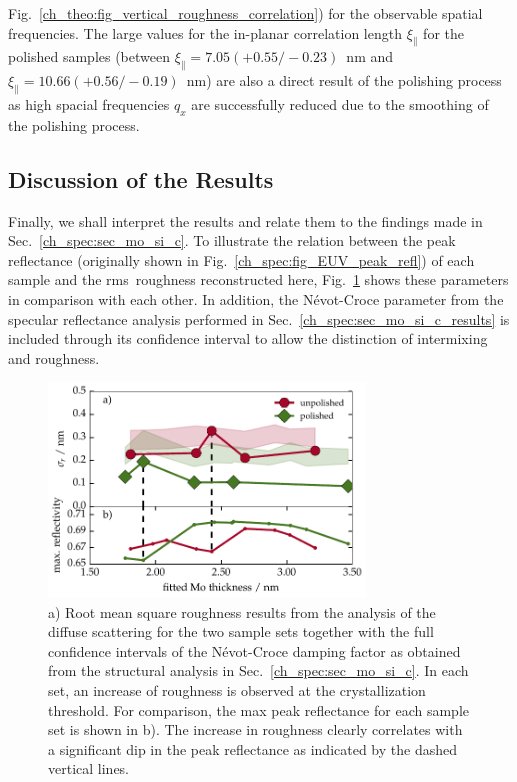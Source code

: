 Fig.~\ref{ch_theo:fig_vertical_roughness_correlation}) for the observable spatial frequencies. The large values for the in-planar correlation length $\xi_\parallel$ for the polished samples (between $\xi_\parallel = 7.05(+0.55/-0.23)$~nm and $\xi_\parallel = 10.66(+0.56/-0.19)$~nm) are also a direct result of the polishing process as high spacial frequencies $q_x$ are successfully reduced due to the smoothing of the polishing process.

\subsection{Discussion of the Results}
Finally, we shall interpret the results and relate them to the findings made in Sec.~\ref{ch_spec:sec_mo_si_c}. To illustrate the relation between the peak reflectance (originally shown in Fig.~\ref{ch_spec:fig_EUV_peak_refl}) of each sample and the \gls{rms}~roughness reconstructed here, Fig.~\ref{ch_diff:fig_Mo_Si_C_PSD_results} shows these parameters in comparison with each other. In addition, the N\'{e}vot-Croce parameter from the specular reflectance analysis performed in Sec.~\ref{ch_spec:sec_mo_si_c_results} is included through its confidence interval to allow the distinction of intermixing and roughness.
\begin{figure}[htbp]
\centering
\includegraphics[width=0.75\textwidth]{img/MoSiC_PSD_results}
\caption{a) Root mean square roughness results from the analysis of the diffuse scattering for the two sample sets together with the full confidence intervals of the N\'{e}vot-Croce damping factor as obtained from the structural analysis in Sec.~\ref{ch_spec:sec_mo_si_c}. In each set, an increase of roughness is observed at the crystallization threshold. For comparison, the max peak reflectance for each sample set is shown in b). The increase in roughness clearly correlates with a significant dip in the peak reflectance as indicated by the dashed vertical lines.}
\label{ch_diff:fig_Mo_Si_C_PSD_results}
\end{figure}

